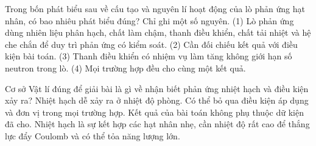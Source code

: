 \begin{ex}
Trong bốn phát biểu sau về cấu tạo và nguyên lí hoạt động của lò phản ứng hạt nhân, có bao nhiêu phát biểu đúng? Chỉ ghi một số nguyên. (1) Lò phản ứng dùng nhiên liệu phân hạch, chất làm chậm, thanh điều khiển, chất tải nhiệt và hệ che chắn để duy trì phản ứng có kiểm soát. (2) Cần đối chiếu kết quả với điều kiện bài toán. (3) Thanh điều khiển có nhiệm vụ làm tăng không giới hạn số neutron trong lò. (4) Mọi trường hợp đều cho cùng một kết quả.
\end{ex}

\begin{ex}
Cơ sở Vật lí đúng để giải bài là gì về nhận biết phản ứng nhiệt hạch và điều kiện xảy ra?
\choice
{Nhiệt hạch dễ xảy ra ở nhiệt độ phòng.}
{Có thể bỏ qua điều kiện áp dụng và đơn vị trong mọi trường hợp.}
{Kết quả của bài toán không phụ thuộc dữ kiện đã cho.}
{\True Nhiệt hạch là sự kết hợp các hạt nhân nhẹ, cần nhiệt độ rất cao để thắng lực đẩy Coulomb và có thể tỏa năng lượng lớn.}
\end{ex}

